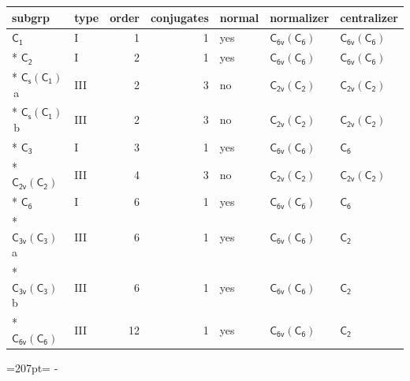 \documentclass[10pt,a4paper]{article}
\newcommand{\needspace}[1]{\par\penalty-100\begingroup\dimen0=#1\relax\dimen2=\pagegoal
  \advance\dimen2-\pagetotal\ifdim\dimen0>\dimen2\relax\ifdim\dimen2>0pt\vfil\break\fi\fi
  \endgroup}
\numberwithin{equation}{section}
\newcommand{\grp}[1]{\mathsf{#1}}
\newcommand{\clsletter}[1]{\,{\scriptsize\color{black!55}#1}}
\begin{document}
{\small\begin{longtable}{@{}llrrlll@{}}\toprule
subgrp & type & order & conjugates & normal & normalizer & centralizer\\\midrule\endhead
\bottomrule\endfoot\endlastfoot
\href{../../../rotation/data/pdf/C1.pdf}{$\grp{C_{1}}$} & I & 1 & 1 & yes & \href{C6v-C6.pdf}{$\grp{C_{6v}}(\grp{C_{6}})$} & \href{C6v-C6.pdf}{$\grp{C_{6v}}(\grp{C_{6}})$}\\*
\href{../../../rotation/data/pdf/C2.pdf}{$\grp{C_{2}}$} & I & 2 & 1 & yes & \href{C6v-C6.pdf}{$\grp{C_{6v}}(\grp{C_{6}})$} & \href{C6v-C6.pdf}{$\grp{C_{6v}}(\grp{C_{6}})$}\\*
\href{C1v-C1.pdf}{$\grp{C_{s}}(\grp{C_{1}})$}\clsletter{a} & III & 2 & 3 & no & \href{C2v-C2.pdf}{$\grp{C_{2v}}(\grp{C_{2}})$} & \href{C2v-C2.pdf}{$\grp{C_{2v}}(\grp{C_{2}})$}\\*
\href{C1v-C1.pdf}{$\grp{C_{s}}(\grp{C_{1}})$}\clsletter{b} & III & 2 & 3 & no & \href{C2v-C2.pdf}{$\grp{C_{2v}}(\grp{C_{2}})$} & \href{C2v-C2.pdf}{$\grp{C_{2v}}(\grp{C_{2}})$}\\*
\href{../../../rotation/data/pdf/C3.pdf}{$\grp{C_{3}}$} & I & 3 & 1 & yes & \href{C6v-C6.pdf}{$\grp{C_{6v}}(\grp{C_{6}})$} & \href{../../../rotation/data/pdf/C6.pdf}{$\grp{C_{6}}$}\\*
\href{C2v-C2.pdf}{$\grp{C_{2v}}(\grp{C_{2}})$} & III & 4 & 3 & no & \href{C2v-C2.pdf}{$\grp{C_{2v}}(\grp{C_{2}})$} & \href{C2v-C2.pdf}{$\grp{C_{2v}}(\grp{C_{2}})$}\\*
\href{../../../rotation/data/pdf/C6.pdf}{$\grp{C_{6}}$} & I & 6 & 1 & yes & \href{C6v-C6.pdf}{$\grp{C_{6v}}(\grp{C_{6}})$} & \href{../../../rotation/data/pdf/C6.pdf}{$\grp{C_{6}}$}\\*
\href{C3v-C3.pdf}{$\grp{C_{3v}}(\grp{C_{3}})$}\clsletter{a} & III & 6 & 1 & yes & \href{C6v-C6.pdf}{$\grp{C_{6v}}(\grp{C_{6}})$} & \href{../../../rotation/data/pdf/C2.pdf}{$\grp{C_{2}}$}\\*
\href{C3v-C3.pdf}{$\grp{C_{3v}}(\grp{C_{3}})$}\clsletter{b} & III & 6 & 1 & yes & \href{C6v-C6.pdf}{$\grp{C_{6v}}(\grp{C_{6}})$} & \href{../../../rotation/data/pdf/C2.pdf}{$\grp{C_{2}}$}\\*
\href{C6v-C6.pdf}{$\grp{C_{6v}}(\grp{C_{6}})$} & III & 12 & 1 & yes & \href{C6v-C6.pdf}{$\grp{C_{6v}}(\grp{C_{6}})$} & \href{../../../rotation/data/pdf/C2.pdf}{$\grp{C_{2}}$}\\
\bottomrule\end{longtable}}
\needspace{207pt}
\end{document}
